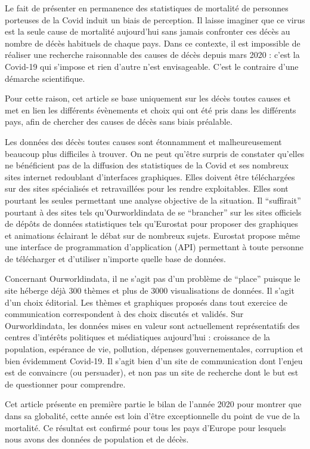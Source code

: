\documentclass[
]{article}
\begin{document}
Le fait de présenter en permanence des statistiques de mortalité de
personnes porteuses de la Covid induit un biais de perception. Il laisse
imaginer que ce virus est la seule cause de mortalité aujourd'hui sans
jamais confronter ces décès au nombre de décès habituels de chaque pays.
Dans ce contexte, il est impossible de réaliser une recherche
raisonnable des causes de décès depuis mars 2020 : c'est la Covid-19 qui
s'impose et rien d'autre n'est envisageable. C'est le contraire d'une
démarche scientifique.

Pour cette raison, cet article se base uniquement sur les décès toutes
causes et met en lien les différents évènements et choix qui ont été
pris dans les différents pays, afin de chercher des causes de décès sans
biais préalable.

Les données des décès toutes causes sont étonnamment et malheureusement
beaucoup plus difficiles à trouver. On ne peut qu'être surpris de
constater qu'elles ne bénéficient pas de la diffusion des statistiques
de la Covid et ses nombreux sites internet redoublant d'interfaces
graphiques. Elles doivent être téléchargées sur des sites spécialisés et
retravaillées pour les rendre exploitables. Elles sont pourtant les
seules permettant une analyse objective de la situation. Il
``suffirait'' pourtant à des sites tels qu'Ourworldindata de se
``brancher'' sur les sites officiels de dépôts de données statistiques
tels qu'Eurostat pour proposer des graphiques et animations éclairant le
débat sur de nombreux sujets. Eurostat propose même une interface de
programmation d'application (API) permettant à toute personne de
télécharger et d'utiliser n'importe quelle base de données.

Concernant Ourworldindata, il ne s'agit pas d'un problème de ``place''
puisque le site héberge déjà 300 thèmes et plus de 3000 visualisations
de données. Il s'agit d'un choix éditorial. Les thèmes et graphiques
proposés dans tout exercice de communication correspondent à des choix
discutés et validés. Sur Ourworldindata, les données mises en valeur
sont actuellement représentatifs des centres d'intérêts politiques et
médiatiques aujourd'hui : croissance de la population, espérance de vie,
pollution, dépenses gouvernementales, corruption et bien évidemment
Covid-19. Il s'agit bien d'un site de communication dont l'enjeu est de
convaincre (ou persuader), et non pas un site de recherche dont le but
est de questionner pour comprendre.

Cet article présente en première partie le bilan de l'année 2020 pour
montrer que dans sa globalité, cette année est loin d'être
exceptionnelle du point de vue de la mortalité. Ce résultat est confirmé
pour tous les pays d'Europe pour lesquels nous avons des données de
population et de décès.
\end{document}
